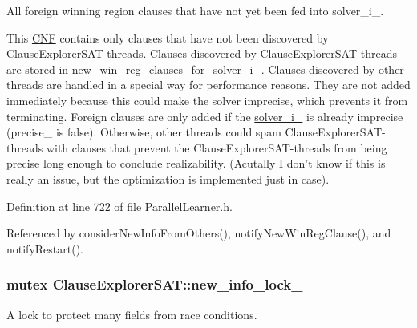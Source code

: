 All foreign winning region clauses that have not yet been fed into solver\-\_\-i\-\_\-. 

This \hyperlink{classCNF}{C\-N\-F} contains only clauses that have not been discovered by Clause\-Explorer\-S\-A\-T-\/threads. Clauses discovered by Clause\-Explorer\-S\-A\-T-\/threads are stored in \hyperlink{classClauseExplorerSAT_a2c3e73b4c0529b9139354a965d34e81f}{new\-\_\-win\-\_\-reg\-\_\-clauses\-\_\-for\-\_\-solver\-\_\-i\-\_\-}. Clauses discovered by other threads are handled in a special way for performance reasons. They are not added immediately because this could make the solver imprecise, which prevents it from terminating. Foreign clauses are only added if the \hyperlink{classClauseExplorerSAT_a65b5b3d04ff5be8bfec60d3dcf86e4d0}{solver\-\_\-i\-\_\-} is already imprecise (precise\-\_\- is false). Otherwise, other threads could spam Clause\-Explorer\-S\-A\-T-\/threads with clauses that prevent the Clause\-Explorer\-S\-A\-T-\/threads from being precise long enough to conclude realizability. (Acutally I don't know if this is really an issue, but the optimization is implemented just in case). 

Definition at line 722 of file Parallel\-Learner.\-h.



Referenced by consider\-New\-Info\-From\-Others(), notify\-New\-Win\-Reg\-Clause(), and notify\-Restart().

\hypertarget{classClauseExplorerSAT_a674651f8fbf9ed93264ce3369bd5332b}{
\subsubsection[{new\-\_\-info\-\_\-lock\-\_\-}]{\setlength{\rightskip}{0pt plus 5cm}mutex Clause\-Explorer\-S\-A\-T\-::new\-\_\-info\-\_\-lock\-\_\-\hspace{0.3cm}{\ttfamily [protected]}}}\label{classClauseExplorerSAT_a674651f8fbf9ed93264ce3369bd5332b}


A lock to protect many fields from race conditions. 

